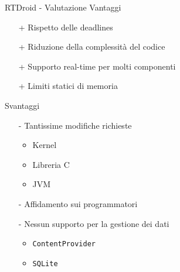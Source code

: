 \begin{frame}{RTDroid - Valutazione}
	Vantaggi
	\begin{itemize}
		\item[+] Rispetto delle deadlines
		\item[+] Riduzione della complessità del codice
		\item[+] Supporto real-time per molti componenti
		\item[+] Limiti statici di memoria
	\end{itemize}
	\vspace{20px}
	Svantaggi
	\begin{itemize}
		\item[-] Tantissime modifiche richieste
		\begin{itemize}
			\item Kernel
			\item Libreria C
			\item JVM
		\end{itemize}
		\item[-] Affidamento sui programmatori
		\item[-] Nessun supporto per la gestione dei dati
		\begin{itemize}
			\item \texttt{ContentProvider}
			\item \texttt{SQLite}
		\end{itemize}
	\end{itemize}
\end{frame}